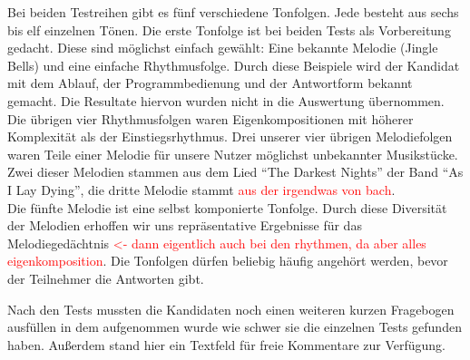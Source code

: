 \documentclass{acm_proc_article-sp}
\begin{document}
Bei beiden Testreihen gibt es fünf verschiedene Tonfolgen. Jede besteht aus sechs bis elf einzelnen Tönen. Die erste Tonfolge ist bei beiden Tests als Vorbereitung gedacht. Diese sind möglichst einfach gewählt: Eine bekannte Melodie (Jingle Bells) und eine einfache Rhythmusfolge. Durch diese Beispiele wird der Kandidat mit dem Ablauf, der Programmbedienung und der Antwortform bekannt gemacht. Die Resultate hiervon wurden nicht in die Auswertung übernommen. \\
Die übrigen vier Rhythmusfolgen waren Eigenkompositionen mit höherer Komplexität als der Einstiegsrhythmus.
Drei unserer vier übrigen Melodiefolgen waren Teile einer Melodie für unsere Nutzer möglichst unbekannter Musikstücke.
Zwei dieser Melodien stammen aus dem Lied "`The Darkest Nights"' der Band "`As I Lay Dying"', die dritte Melodie stammt \textcolor{red}{aus der irgendwas von bach}.\\
Die fünfte Melodie ist eine selbst komponierte Tonfolge. Durch diese Diversität der Melodien erhoffen wir uns repräsentative Ergebnisse für das Melodiegedächtnis \textcolor{red}{<- dann eigentlich auch bei den rhythmen, da aber alles eigenkomposition}. Die Tonfolgen dürfen beliebig häufig angehört werden, bevor der Teilnehmer die Antworten gibt.
 
Nach den Tests mussten die Kandidaten noch einen weiteren kurzen Fragebogen ausfüllen in dem aufgenommen wurde wie schwer sie die einzelnen Tests gefunden haben. Außerdem stand hier ein Textfeld für freie Kommentare zur Verfügung. 
\end{document}
